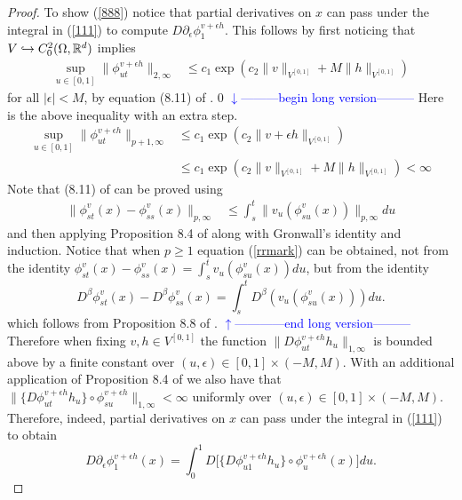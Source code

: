 \documentclass[noinfoline]{imsart}
\def\Ver{1}
\def\LongVer{0}
\begin{document}
\begin{proof}
 To show (\ref{888}) notice  that partial derivatives on $x$ can pass under the integral in (\ref{111})  to compute $D {\partial_\epsilon}  \phi^{ v+\epsilon h}_{1}$. This follows by first noticing that  $V\hookrightarrow C_0^{2}(\Omega, \Bbb R^d)$ implies
  \begin{align}
  \sup_{u\in[0,1]} \bigl\| \phi_{ut}^{v+\epsilon h} \bigr\|_{2,\infty}&\leq c_1 \exp\left({c_2 \|  {v\|_{V^{[0,1]}}+M\| h} \|_{V^{[0,1]}}}\right) \label{811}
  \end{align}
  for all $|\epsilon|< M$, by equation (8.11) of \cite{you:10}.
\if\Ver\LongVer{
{\flushleft\textcolor{blue}{$\downarrow$---------begin long version---------}}\newline
Here is the above inequality with an extra step.
 \begin{align}
  \sup_{u\in[0,1]} \| \phi_{ut}^{v+\epsilon h} \|_{p+1,\infty}&\leq c_1 \exp\left({c_2 \|  {v+\epsilon h} \|_{V^{[0,1]}}}\right)\\
  &\leq c_1 \exp\left({c_2 \|  {v\|_{V^{[0,1]}}+M\| h} \|_{V^{[0,1]}}}\right) <\infty \label{811}
  \end{align}
 Note that   (8.11) of  \cite{you:10} can be proved using
 \begin{align}
 \label{rrmark}
  \| \phi_{st}^v(x) - \phi_{ss}^v(x) \|_{p,\infty}
  &\leq\int_s^t \|  v_u(\phi_{su}^v(x))   \|_{p,\infty} du
 \end{align}
 and then applying Proposition 8.4 of \cite{you:10} along with Gronwall's identity and induction. Notice that when $p\geq 1$ equation (\ref{rrmark}) can be obtained, not from the identity $\phi_{st}^v(x) - \phi_{ss}^v(x)= \int_s^t  v_u(\phi_{su}^v(x))    du$, but from the identity
 \[ D^\beta\phi_{st}^v(x) - D^\beta\phi_{ss}^v(x)= \int_s^t    D^\beta(v_u(\phi_{su}^v(x)))   du.\]
 which follows from Proposition 8.8 of  \cite{you:10}.
   {\flushleft\textcolor{blue}{$\uparrow$------------end long version---------}}\newline
} \fi
Therefore when fixing $v, h\in V^{[0,1]}$ the function $ \| D\phi^{v+\epsilon h}_{ut} h_u \|_{1,\infty}$ is bounded above by a finite constant over $(u,\epsilon)\in[0,1]\times (-M,M)$. With an additional application of Proposition 8.4 of \cite{you:10} we also have that
  $ \bigl\| \{D\phi^{v+\epsilon h}_{ut} h_u\}\circ \phi_{su}^{v+\epsilon h} \bigr\|_{1,\infty}<\infty$ uniformly over $(u,\epsilon)\in[0,1]\times (-M,M)$.
Therefore, indeed, partial derivatives on $x$ can pass under the integral in (\ref{111})  to obtain
\begin{equation}
\label{pass}
D {\partial_\epsilon}  \phi^{ v+\epsilon h}_{1}(x) = \int_0^1 D\bigl[ \{D\phi_{u1}^{v+\epsilon h} h_u  \}\circ \phi_u^{v+\epsilon h} (x)\bigr]  du.
\end{equation}


\end{proof}
\end{document}
